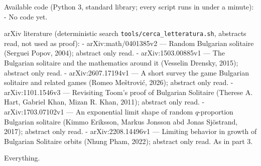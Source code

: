 Available code (Python 3, standard library; every script runs in under a
minute): - No code yet.


arXiv literature (deterministic search
\texttt{tools/cerca\_letteratura.sh}, abstracts read, not used as
proof): - arXiv:math/0401385v2 --- Random Bulgarian solitaire (Serguei
Popov, 2004); abstract only read. - arXiv:1503.00885v1 --- The Bulgarian
solitaire and the mathematics around it (Vesselin Drensky, 2015);
abstract only read. - arXiv:2607.17194v1 --- A short survey the game
Bulgarian solitaire and related games (Romeo Meštrović, 2026); abstract
only read. - arXiv:1101.1546v3 --- Revisiting Toom's proof of Bulgarian
Solitaire (Therese A. Hart, Gabriel Khan, Mizan R. Khan, 2011); abstract
only read. - arXiv:1703.07102v1 --- An exponential limit shape of random
\(q\)-proportion Bulgarian solitaire (Kimmo Eriksson, Markus Jonsson abd
Jonas Sjöstrand, 2017); abstract only read. - arXiv:2208.14496v1 ---
Limiting behavior in growth of Bulgarian Solitaire orbits (Nhung Pham,
2022); abstract only read. As in part 3.


Everything.

